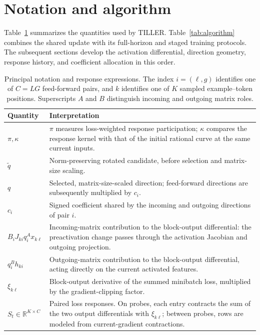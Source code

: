 \section{Notation and algorithm}
\label{sec:algorithm-overview}

Table~\ref{tab:notation} summarizes the quantities used by TILLER.
Table~\ref{tab:algorithm} combines the shared update with its
full-horizon and staged training protocols. The subsequent sections
develop the activation differential, direction geometry, response
history, and coefficient allocation in this order.

\begin{table}[!htbp]
\caption{Principal notation and response expressions.
The index $i=(\ell,g)$ identifies one of $C=LG$ feed-forward pairs,
and $k$ identifies one of $K$ sampled example--token positions.
Superscripts $A$ and $B$ distinguish incoming and outgoing matrix roles.}
\label{tab:notation}
\centering
\small
\begin{tabularx}{\linewidth}{@{}l >{\raggedright\arraybackslash}X@{}}
\toprule
Quantity & Interpretation\\
\midrule
$\pi,\kappa$ & $\pi$ measures loss-weighted response participation;
$\kappa$ compares the response kernel with that of the initial
rational curve at the same current inputs.\\
$\widetilde q$ & Norm-preserving rotated candidate, before selection
and matrix-size scaling.\\
$q$ & Selected, matrix-size-scaled direction; feed-forward directions
are subsequently multiplied by $c_i$.\\
$c_i$ & Signed coefficient shared by the incoming and outgoing
directions of pair $i$.\\
\addlinespace[3pt]
$B_iJ_{ki}q_i^Ax_{k\ell}$ & Incoming-matrix contribution to the block-output
differential: the preactivation change passes through the activation
Jacobian and outgoing projection.\\
$q_i^Bh_{ki}$ & Outgoing-matrix contribution to the block-output
differential, acting directly on the current activated features.\\
$\xi_{k\ell}$ & Block-output derivative of the summed minibatch loss,
multiplied by the gradient-clipping factor.\\
$S_t\in\mathbb R^{K\times C}$ & Paired loss responses. On probes, each
entry contracts the sum of the two output differentials with $\xi_{k\ell}$;
between probes, rows are modeled from current-gradient contractions.\\

\end{tabularx}
\end{table}
